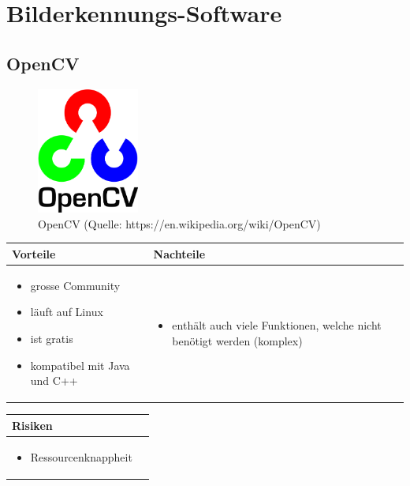 
\section{Bilderkennungs-Software}


\subsection{OpenCV}

\begin{figure}[h!]%
\centering
\includegraphics[width=0.3\textwidth]{fig/opencv.png}
\caption{OpenCV (Quelle: https://en.wikipedia.org/wiki/OpenCV)}
\label{fig:OpenCV}
\end{figure}

\begin{table}[h]
\begin{tabular}{p{} | p{}}



 \textbf{Vorteile} & \textbf{Nachteile} \\ \hline
	 
\begin{itemize}
\item grosse Community
\item läuft auf Linux
\item ist gratis
\item kompatibel mit Java und C++
\end{itemize}

 
 &
 
\begin{itemize}
\item enthält auch viele Funktionen, welche nicht benötigt werden (komplex)
\end{itemize}

\end{tabular}
\end{table}

\begin{table}[h]
\begin{tabular}{p{}p{}}


 \textbf{Risiken} & \\ \hline
	 
\begin{itemize}
\item Ressourcenknappheit
\end{itemize}

 
\end{tabular}
\end{table}

